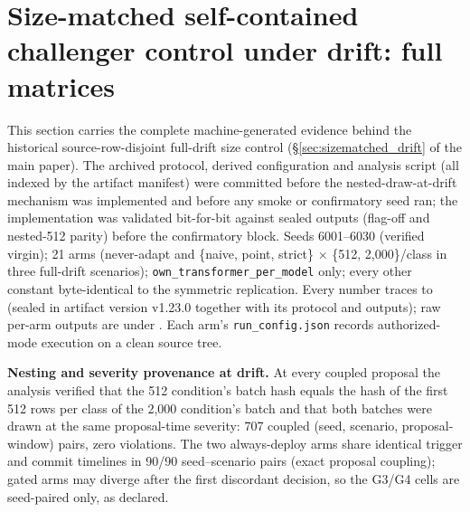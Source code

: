 \documentclass[a4paper,11pt]{article}
\begin{document}





\section{Size-matched self-contained challenger control under drift: full matrices}
\label{sec:supp_sizematched_drift}

This section carries the complete machine-generated evidence behind the historical
source-row-disjoint full-drift size control (\S\ref{sec:sizematched_drift} of the main paper). The archived
protocol, derived configuration and analysis script (all indexed by the artifact
manifest) were committed before the
nested-draw-at-drift mechanism was implemented and before any smoke or confirmatory seed
ran; the implementation was validated bit-for-bit against sealed outputs (flag-off and
nested-512 parity) before the confirmatory block. Seeds 6001--6030 (verified virgin);
21 arms (never-adapt and \{naive, point, strict\} $\times$ \{512, 2{,}000\}/class in
three full-drift scenarios); \texttt{own\_transformer\_per\_model} only; every other
constant byte-identical to the symmetric replication. Every number traces to
 (sealed in artifact version v1.23.0 together with its protocol and outputs);
raw per-arm outputs are under . Each arm's
\texttt{run\_config.json} records authorized-mode execution on a clean source tree.

\textbf{Nesting and severity provenance at drift.} At every coupled proposal the analysis
verified that the 512 condition's batch hash equals the hash of the first 512 rows per
class of the 2{,}000 condition's batch and that both batches were drawn at the same
proposal-time severity: 707 coupled (seed, scenario, proposal-window) pairs, zero
violations. The two always-deploy arms share identical trigger and commit timelines in
90/90 seed--scenario pairs (exact proposal coupling); gated arms may diverge after the
first discordant decision, so the G3/G4 cells are seed-paired only, as declared.
\end{document}
